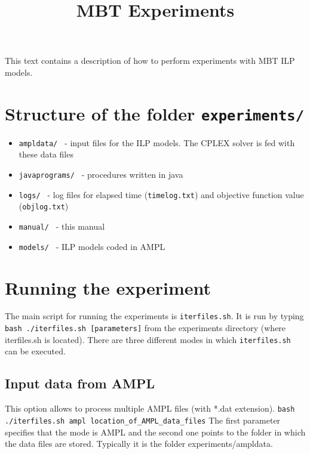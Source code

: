 \documentclass[12pt]{article}
\title{MBT Experiments}
\begin{document}
\maketitle
This text contains a description of how to perform experiments with MBT ILP models.

\section{Structure of the folder \texttt{experiments/}}
\begin{itemize}
	\item\texttt{ampldata/ } - input files for the ILP models. The CPLEX solver is fed with these data files
	\item\texttt{javaprograms/ } - procedures written in java 
	\item\texttt{logs/ } - log files for elapsed time (\texttt{timelog.txt}) and objective function value (\texttt{objlog.txt})
	\item\texttt{manual/ } - this manual
	\item\texttt{models/ } - ILP models coded in AMPL
\end{itemize}

\section{Running the experiment}

The main script for running the experiments is \texttt{iterfiles.sh}.
It is run by typing \newline\newline
\texttt{bash ./iterfiles.sh [parameters]}\newline\newline
from the experiments directory (where iterfiles.sh is located).
There are three different modes in which \texttt{iterfiles.sh} can be executed.

\subsection{Input data from AMPL}

This option allows to process multiple AMPL files (with *.dat extension). \newline\newline
\texttt{bash ./iterfiles.sh ampl location\_of\_AMPL\_data\_files}\newline\newline
The first parameter specifies that the mode is AMPL and the second one points to the folder in which the data files are stored.
Typically it is the folder experiments/ampldata.
\end{document}
